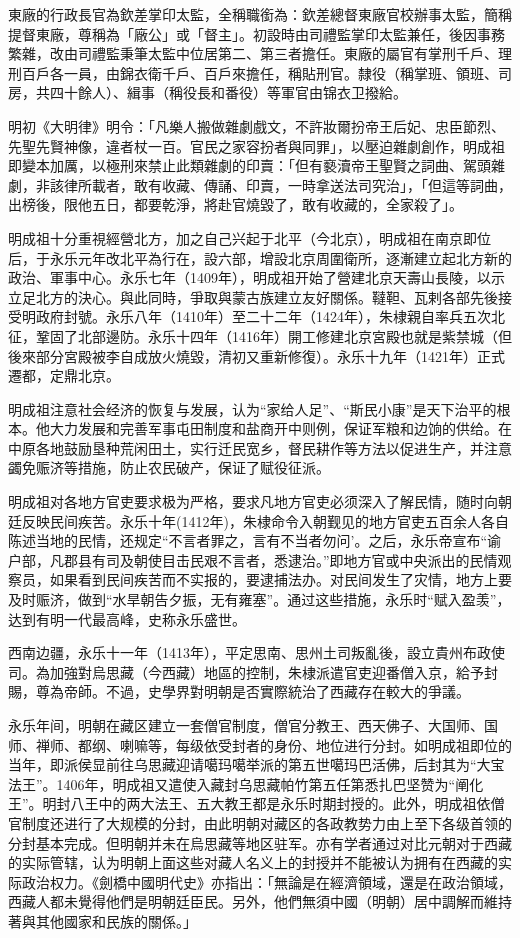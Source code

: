 東廠的行政長官為欽差掌印太監，全稱職銜為：欽差總督東廠官校辦事太監，簡稱提督東廠，尊稱為「廠公」或「督主」。初設時由司禮監掌印太監兼任，後因事務繁雜，改由司禮監秉筆太監中位居第二、第三者擔任。東廠的屬官有掌刑千戶、理刑百戶各一員，由錦衣衛千戶、百戶來擔任，稱貼刑官。隸役（稱掌班、領班、司房，共四十餘人）、緝事（稱役長和番役）等軍官由锦衣卫撥給。

明初《大明律》明令：「凡樂人搬做雜劇戲文，不許妝爾扮帝王后妃、忠臣節烈、先聖先賢神像，違者杖一百。官民之家容扮者與同罪」，以壓迫雜劇創作，明成祖即變本加厲，以極刑來禁止此類雜劇的印賣：「但有褻瀆帝王聖賢之詞曲、駕頭雜劇，非該律所載者，敢有收藏、傳誦、印賣，一時拿送法司究治」，「但這等詞曲，出榜後，限他五日，都要乾淨，將赴官燒毀了，敢有收藏的，全家殺了」。

明成祖十分重視經營北方，加之自己兴起于北平（今北京），明成祖在南京即位后，于永乐元年改北平為行在，設六部，增設北京周圍衛所，逐漸建立起北方新的政治、軍事中心。永乐七年（1409年），明成祖开始了營建北京天壽山長陵，以示立足北方的決心。與此同時，爭取與蒙古族建立友好關係。韃靼、瓦剌各部先後接受明政府封號。永乐八年（1410年）至二十二年（1424年），朱棣親自率兵五次北征，鞏固了北部邊防。永乐十四年（1416年）開工修建北京宮殿也就是紫禁城（但後來部分宮殿被李自成放火燒毀，清初又重新修復）。永乐十九年（1421年）正式遷都，定鼎北京。

明成祖注意社会经济的恢复与发展，认为“家给人足”、“斯民小康”是天下治平的根本。他大力发展和完善军事屯田制度和盐商开中则例，保证军粮和边饷的供给。在中原各地鼓励垦种荒闲田土，实行迁民宽乡，督民耕作等方法以促进生产，并注意蠲免赈济等措施，防止农民破产，保证了赋役征派。

明成祖对各地方官吏要求极为严格，要求凡地方官吏必须深入了解民情，随时向朝廷反映民间疾苦。永乐十年(1412年)，朱棣命令入朝觐见的地方官吏五百余人各自陈述当地的民情，还规定“不言者罪之，言有不当者勿问’。之后，永乐帝宣布“谕户部，凡郡县有司及朝使目击民艰不言者，悉逮治。”即地方官或中央派出的民情观察员，如果看到民间疾苦而不实报的，要逮捕法办。对民间发生了灾情，地方上要及时赈济，做到“水旱朝告夕振，无有雍塞”。通过这些措施，永乐时“赋入盈羡”，达到有明一代最高峰，史称永乐盛世。

西南边疆，永乐十一年（1413年），平定思南、思州土司叛亂後，設立貴州布政使司。為加強對烏思藏（今西藏）地區的控制，朱棣派遣官吏迎番僧入京，給予封賜，尊為帝師。不過，史學界對明朝是否實際統治了西藏存在較大的爭議。

永乐年间，明朝在藏区建立一套僧官制度，僧官分教王、西天佛子、大国师、国师、禅师、都纲、喇嘛等，每级依受封者的身份、地位进行分封。如明成祖即位的当年，即派侯显前往乌思藏迎请噶玛噶举派的第五世噶玛巴活佛，后封其为“大宝法王”。1406年，明成祖又遣使入藏封乌思藏帕竹第五任第悉扎巴坚赞为“阐化王”。明封八王中的两大法王、五大教王都是永乐时期封授的。此外，明成祖依僧官制度还进行了大规模的分封，由此明朝对藏区的各政教势力由上至下各级首领的分封基本完成。但明朝并未在烏思藏等地区驻军。亦有学者通过对比元朝对于西藏的实际管辖，认为明朝上面这些对藏人名义上的封授并不能被认为拥有在西藏的实际政治权力。《劍橋中國明代史》亦指出：「無論是在經濟領域，還是在政治領域，西藏人都未覺得他們是明朝廷臣民。另外，他們無須中國（明朝）居中調解而維持著與其他國家和民族的關係。」

